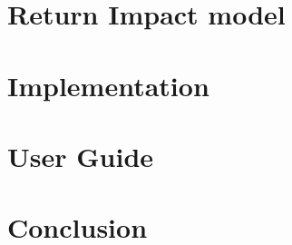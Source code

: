 \documentclass[11pt,a4paper,]{article}
\begin{document}
\hypertarget{return-impact-model}{%
\section{Return Impact model}\label{return-impact-model}}

\hypertarget{implementation}{%
\section{Implementation}\label{implementation}}

\hypertarget{user-guide}{%
\section{User Guide}\label{user-guide}}

\hypertarget{conclusion}{%
\section{Conclusion}\label{conclusion}}

\printbibliography[title=Bibliography]
\end{document}

